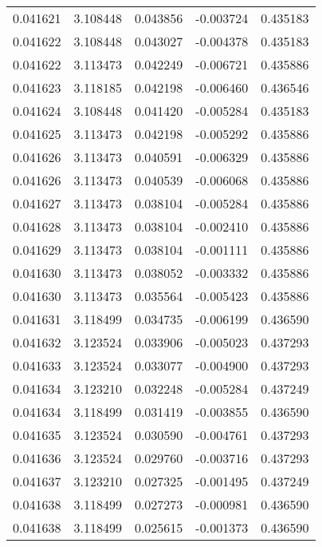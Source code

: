 \begin{tabular}{lrrrr}
0.041621    &  3.108448 &  0.043856 & -0.003724 &             0.435183 \\
0.041622    &  3.108448 &  0.043027 & -0.004378 &             0.435183 \\
0.041622    &  3.113473 &  0.042249 & -0.006721 &             0.435886 \\
0.041623    &  3.118185 &  0.042198 & -0.006460 &             0.436546 \\
0.041624    &  3.108448 &  0.041420 & -0.005284 &             0.435183 \\
0.041625    &  3.113473 &  0.042198 & -0.005292 &             0.435886 \\
0.041626    &  3.113473 &  0.040591 & -0.006329 &             0.435886 \\
0.041626    &  3.113473 &  0.040539 & -0.006068 &             0.435886 \\
0.041627    &  3.113473 &  0.038104 & -0.005284 &             0.435886 \\
0.041628    &  3.113473 &  0.038104 & -0.002410 &             0.435886 \\
0.041629    &  3.113473 &  0.038104 & -0.001111 &             0.435886 \\
0.041630    &  3.113473 &  0.038052 & -0.003332 &             0.435886 \\
0.041630    &  3.113473 &  0.035564 & -0.005423 &             0.435886 \\
0.041631    &  3.118499 &  0.034735 & -0.006199 &             0.436590 \\
0.041632    &  3.123524 &  0.033906 & -0.005023 &             0.437293 \\
0.041633    &  3.123524 &  0.033077 & -0.004900 &             0.437293 \\
0.041634    &  3.123210 &  0.032248 & -0.005284 &             0.437249 \\
0.041634    &  3.118499 &  0.031419 & -0.003855 &             0.436590 \\
0.041635    &  3.123524 &  0.030590 & -0.004761 &             0.437293 \\
0.041636    &  3.123524 &  0.029760 & -0.003716 &             0.437293 \\
0.041637    &  3.123210 &  0.027325 & -0.001495 &             0.437249 \\
0.041638    &  3.118499 &  0.027273 & -0.000981 &             0.436590 \\
0.041638    &  3.118499 &  0.025615 & -0.001373 &             0.436590 \\

\end{tabular}
